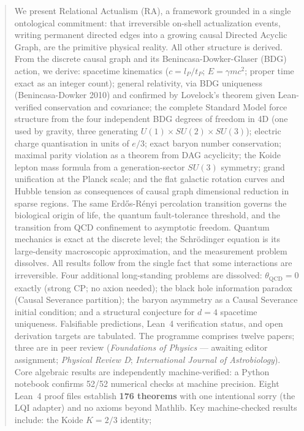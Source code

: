 \documentclass[11pt,a4paper]{article}
\begin{document}
\begin{titlepage}
\begin{abstract}
We present Relational Actualism (RA), a framework grounded in a single
ontological commitment: that irreversible on-shell actualization events,
writing permanent directed edges into a growing causal Directed Acyclic Graph,
are the primitive physical reality. All other structure is derived.
From the discrete causal graph and its Benincasa-Dowker-Glaser (BDG) action,
we derive: spacetime kinematics ($c = l_P/t_P$; $E = \gamma mc^2$; proper time
exact as an integer count); general relativity, via BDG uniqueness
(Benincasa-Dowker 2010) and confirmed by Lovelock's theorem
given Lean-verified conservation and covariance; the complete Standard Model
force structure from the four independent BDG degrees of freedom in 4D (one
used by gravity, three generating $U(1)\times SU(2)\times SU(3)$); electric
charge quantisation in units of $e/3$; exact baryon number conservation;
maximal parity violation as a theorem from DAG acyclicity; the Koide lepton
mass formula from a generation-sector $SU(3)$ symmetry; grand unification at
the Planck scale; and the flat galactic rotation curves and Hubble tension
as consequences of causal graph dimensional reduction in sparse regions.
The same Erd\H{o}s-R\'{e}nyi percolation transition governs the biological
origin of life, the quantum fault-tolerance threshold, and the transition from
QCD confinement to asymptotic freedom.
Quantum mechanics is exact at the discrete level; the Schr\"{o}dinger equation
is its large-density macroscopic approximation, and the measurement problem
dissolves. All results follow from the single fact that some interactions are
irreversible. Four additional long-standing problems are dissolved: $\theta_{\mathrm{QCD}} = 0$ exactly (strong CP; no axion needed); the black hole information paradox (Causal Severance partition); the baryon asymmetry as a Causal Severance initial condition; and a structural conjecture for $d = 4$ spacetime uniqueness. Falsifiable predictions, Lean~4 verification status, and open
derivation targets are tabulated. The programme comprises twelve papers;
three are in peer review (\emph{Foundations of Physics} --- awaiting
editor assignment; \emph{Physical Review D}; \emph{International Journal of Astrobiology}).
Core algebraic results are independently machine-verified: a Python
notebook confirms 52/52 numerical checks at machine precision.
Eight Lean~4 proof files establish \textbf{176 theorems} with one
intentional sorry (the LQI adapter) and no axioms beyond Mathlib.
Key machine-checked results include: the Koide $K = 2/3$ identity;

\end{abstract}
\end{titlepage}
\end{document}
